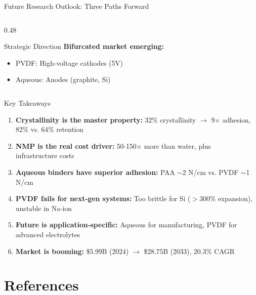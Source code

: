 \documentclass[aspectratio=169]{beamer}
\begin{document}
\begin{frame}{Future Research Outlook: Three Paths Forward}
\begin{columns}[T]
\begin{column}{0.48\textwidth}
            \vspace{0.1cm}
            \begin{exampleblock}{Strategic Direction}
                \footnotesize \textbf{Bifurcated market emerging:}
                \begin{itemize}\footnotesize
                    \item PVDF: High-voltage cathodes (5V)
                    \item Aqueous: Anodes (graphite, Si)
                \end{itemize}
            \end{exampleblock}
        \end{column}
    \end{columns}
\end{frame}

\begin{frame}{Key Takeaways}
    \begin{enumerate}
        \item \textbf{Crystallinity is the master property:} 32\% crystallinity $\rightarrow$ 9$\times$ adhesion, 82\% vs. 64\% retention
        \item \textbf{NMP is the real cost driver:} 50-150$\times$ more than water, plus infrastructure costs
        \item \textbf{Aqueous binders have superior adhesion:} PAA $\sim$2 N/cm vs. PVDF $\sim$1 N/cm
        \item \textbf{PVDF fails for next-gen systems:} Too brittle for Si ($>$300\% expansion), unstable in Na-ion
        \item \textbf{Future is application-specific:} Aqueous for manufacturing, PVDF for advanced electrolytes
        \item \textbf{Market is booming:} \$5.99B (2024) $\rightarrow$ \$28.75B (2033), 20.3\% CAGR
    \end{enumerate}
\end{frame}

\section{References}
\end{document}
